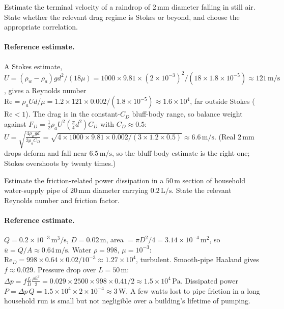 \begin{exercise}
Estimate the terminal velocity of a raindrop of $2\,\si{\milli
\meter}$ diameter falling in still air. State whether the relevant
drag regime is Stokes or beyond, and choose the appropriate
correlation.

\paragraph{Reference estimate.} A Stokes estimate, $U = (\rho_w-
\rho_a)g d^2/(18\mu) = 1000\times9.81\times(2\times10^{-3})^2/(18
\times1.8\times10^{-5}) \approx 121\,\si{\meter\per\second}$, gives a
Reynolds number $\text{Re} = \rho_a U d/\mu = 1.2\times121\times
0.002/(1.8\times10^{-5}) \approx 1.6\times10^{4}$, far outside Stokes
($\text{Re}<1$). The drag is in the constant-$C_D$ bluff-body range,
so balance weight against $F_D = \tfrac12\rho_a U^2 (\tfrac\pi4 d^2)
C_D$ with $C_D\approx0.5$: $U = \sqrt{\tfrac{4\rho_w g d}{3\rho_a
C_D}} = \sqrt{4\times1000\times9.81\times0.002/(3\times1.2\times0.5)}
\approx 6.6\,\si{\meter\per\second}$. (Real $2\,\si{\milli\meter}$
drops deform and fall near $6.5\,\si{\meter\per\second}$, so the
bluff-body estimate is the right one; Stokes overshoots by twenty
times.)
\end{exercise}

\begin{exercise}
Estimate the friction-related power dissipation in a $50\,\si{
\meter}$ section of household water-supply pipe of $20\,\si{\milli
\meter}$ diameter carrying $0.2\,\text{L/s}$. State the relevant
Reynolds number and friction factor.

\paragraph{Reference estimate.} $Q = 0.2\times10^{-3}\,\text{m}^3/
\text{s}$, $D = 0.02\,\si{\meter}$, area $= \pi D^2/4 = 3.14\times
10^{-4}\,\si{\meter}^2$, so $\bar u = Q/A \approx 0.64\,\si{\meter
\per\second}$. Water $\rho=998$, $\mu=10^{-3}$: $\text{Re}_D =
998\times0.64\times0.02/10^{-3} \approx 1.27\times10^{4}$, turbulent.
Smooth-pipe Haaland gives $f\approx0.029$. Pressure drop over
$L=50\,\si{\meter}$: $\Delta p = f\tfrac{L}{D}\tfrac{\rho\bar u^2}{2}
= 0.029\times2500\times998\times0.41/2 \approx 1.5\times10^{4}\,\si{
\pascal}$. Dissipated power $P = \Delta p\,Q = 1.5\times10^4\times
2\times10^{-4} \approx 3\,\si{\watt}$. A few watts lost to pipe
friction in a long household run is small but not negligible over a
building's lifetime of pumping.
\end{exercise}

